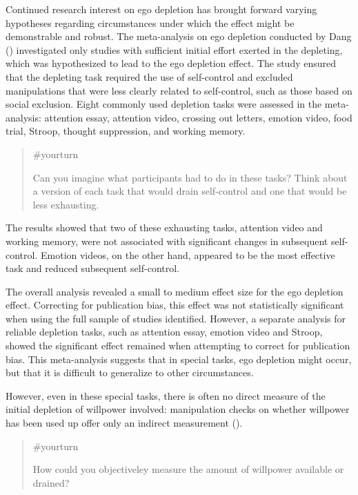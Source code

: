 \documentclass[
  letterpaper,
]{book}
\begin{document}
Continued research interest on ego depletion has brought forward varying
hypotheses regarding circumstances under which the effect might be
demonstrable and robust. The meta-analysis on ego depletion conducted by
Dang () investigated only studies with
sufficient initial effort exerted in the depleting, which was
hypothesized to lead to the ego depletion effect. The study ensured that
the depleting task required the use of self-control and excluded
manipulations that were less clearly related to self-control, such as
those based on social exclusion. Eight commonly used depletion tasks
were assessed in the meta-analysis: attention essay, attention video,
crossing out letters, emotion video, food trial, Stroop, thought
suppression, and working memory.

\begin{quote}
{\#yourturn}

Can you imagine what participants had to do in these tasks? Think about
a version of each task that would drain self-control and one that would
be less exhausting.
\end{quote}

The results showed that two of these exhausting tasks, attention video
and working memory, were not associated with significant changes in
subsequent self-control. Emotion videos, on the other hand, appeared to
be the most effective task and reduced subsequent self-control.

The overall analysis revealed a small to medium effect size for the ego
depletion effect. Correcting for publication bias, this effect was not
statistically significant when using the full sample of studies
identified. However, a separate analysis for reliable depletion tasks,
such as attention essay, emotion video and Stroop, showed the
significant effect remained when attempting to correct for publication
bias. This meta-analysis suggests that in special tasks, ego depletion
might occur, but that it is difficult to generalize to other
circumstances.

However, even in these special tasks, there is often no direct measure
of the initial depletion of willpower involved: manipulation checks on
whether willpower has been used up offer only an indirect measurement
().

\begin{quote}
{\#yourturn}

How could you objectiveley measure the amount of willpower available or
drained?
\end{quote}
\end{document}
